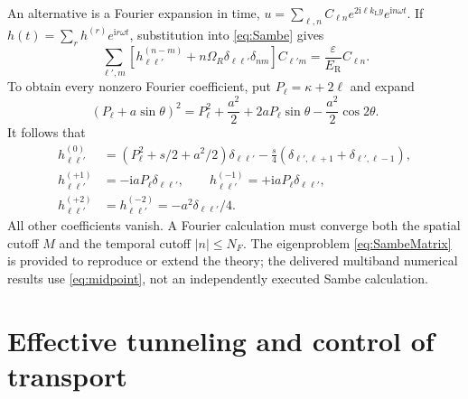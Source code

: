 \documentclass[11pt,oneside]{report}
\numberwithin{equation}{chapter}
\newcommand{\ER}{E_{\mathrm R}}
\newcommand{\ii}{\mathrm i}
\begin{document}
An alternative is a Fourier expansion in time, $u=\sum_{\ell,n}C_{\ell n}e^{2\ii\ell k_{\mathrm L}y}e^{\ii n\omega t}$. If $h(t)=\sum_r h^{(r)}e^{\ii r\omega t}$, substitution into \cref{eq:Sambe} gives
\begin{equation}\label{eq:SambeMatrix}
 \sum_{\ell',m}\left[h^{(n-m)}_{\ell\ell'}+n\Omega_R\delta_{\ell\ell'}\delta_{nm}\right]C_{\ell'm}
 =\frac{\varepsilon}{\ER}C_{\ell n}.
\end{equation}
To obtain every nonzero Fourier coefficient, put $P_\ell=\kappa+2\ell$ and expand
\begin{equation}
 (P_\ell+a\sin\theta)^2=P_\ell^2+\frac{a^2}{2}+2aP_\ell\sin\theta-\frac{a^2}{2}\cos2\theta.
\end{equation}
It follows that
\begin{align}
 h^{(0)}_{\ell\ell'}&=\left(P_\ell^2+s/2+a^2/2\right)\delta_{\ell\ell'}-\frac{s}{4}(\delta_{\ell',\ell+1}+\delta_{\ell',\ell-1}),\\
 h^{(+1)}_{\ell\ell'}&=-\ii aP_\ell\delta_{\ell\ell'},\qquad h^{(-1)}_{\ell\ell'}=+\ii aP_\ell\delta_{\ell\ell'},\\
 h^{(+2)}_{\ell\ell'}&=h^{(-2)}_{\ell\ell'}=-a^2\delta_{\ell\ell'}/4.
\end{align}
All other coefficients vanish. A Fourier calculation must converge both the spatial cutoff $M$ and the temporal cutoff $|n|\leq N_F$. The eigenproblem \cref{eq:SambeMatrix} is provided to reproduce or extend the theory; the delivered multiband numerical results use \cref{eq:midpoint}, not an independently executed Sambe calculation.

\chapter{Effective tunneling and control of transport}
\end{document}
